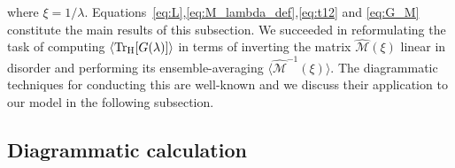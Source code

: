 \documentclass[%
 reprint,
 superscriptaddress,
 amsmath,amssymb,
prx,
]{revtex4-2}\href{\href{}{}}{}
\begin{document}
where $\xi=1/\lambda$.
Equations~\eqref{eq:L},\eqref{eq:M_lambda_def},\eqref{eq:t12} and \eqref{eq:G_M} constitute the main results of this subsection.
We succeeded in reformulating the task of computing $\left\langle\Tr_{\rm H}[G(\lambda)]\right\rangle$ in terms of inverting the matrix $\hat{\mathcal{M}}(\xi)$ linear in disorder and performing its ensemble-averaging $\langle \hat{\mathcal{M}}^{-1}(\xi) \rangle$. 
The diagrammatic techniques for conducting this are well-known and we discuss their application to our model in the  following subsection.




\subsection{Diagrammatic calculation}
\end{document}
